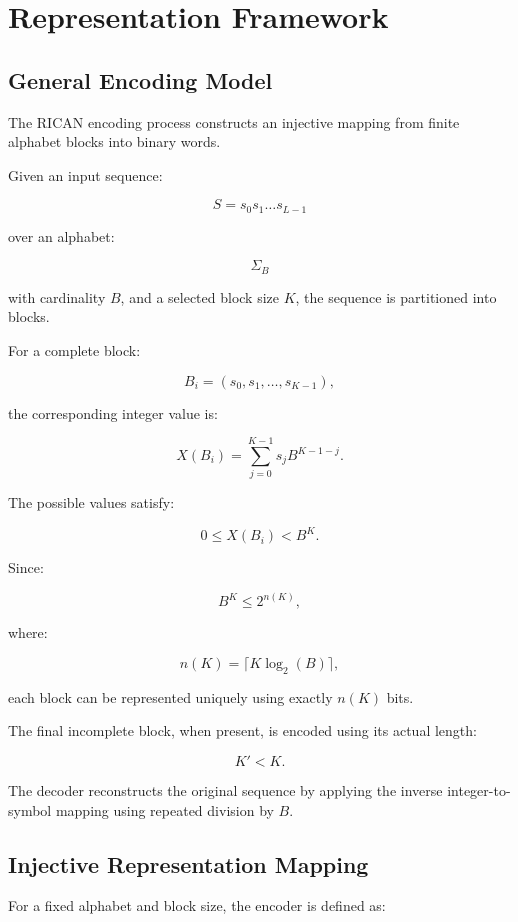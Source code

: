 \documentclass[onecolumn]{IEEEtran}
\begin{document}

\section{Representation Framework}

\subsection{General Encoding Model}

The RICAN encoding process constructs an injective mapping from finite
alphabet blocks into binary words.

Given an input sequence:

\[
S=s_0s_1\ldots s_{L-1}
\]

over an alphabet:

\[
\Sigma_B
\]

with cardinality $B$, and a selected block size $K$, the sequence is
partitioned into blocks.

For a complete block:

\[
B_i=(s_0,s_1,\ldots,s_{K-1}),
\]

the corresponding integer value is:

\[
X(B_i)
=
\sum_{j=0}^{K-1}
s_j B^{K-1-j}.
\]

The possible values satisfy:

\[
0\leq X(B_i)<B^K .
\]

Since:

\[
B^K\leq2^{n(K)},
\]

where:

\[
n(K)=\lceil K\log_2(B)\rceil ,
\]

each block can be represented uniquely using exactly $n(K)$ bits.

The final incomplete block, when present, is encoded using its actual
length:

\[
K'<K .
\]

The decoder reconstructs the original sequence by applying the inverse
integer-to-symbol mapping using repeated division by $B$.

\subsection{Injective Representation Mapping}

For a fixed alphabet and block size, the encoder is defined as:
\end{document}
